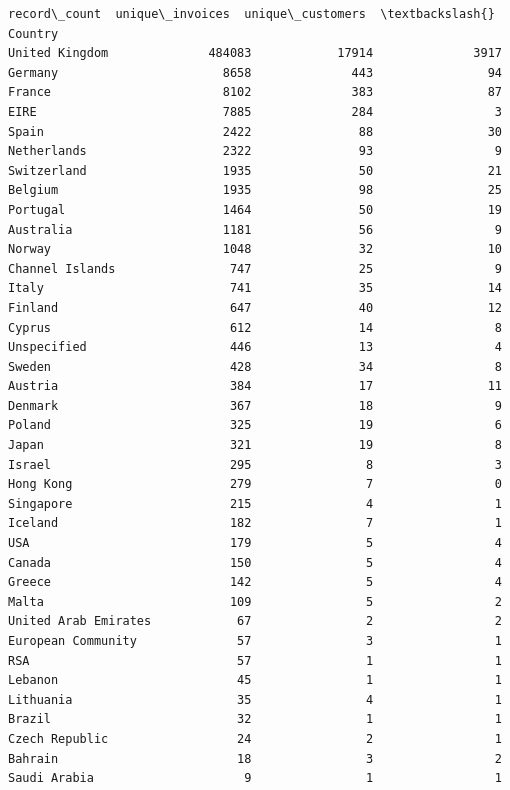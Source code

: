 \documentclass[11pt]{article}
\begin{document}
    
    \begin{Verbatim}[commandchars=\\\{\}]
                      record\_count  unique\_invoices  unique\_customers  \textbackslash{}
Country                                                                 
United Kingdom              484083            17914              3917   
Germany                       8658              443                94   
France                        8102              383                87   
EIRE                          7885              284                 3   
Spain                         2422               88                30   
Netherlands                   2322               93                 9   
Switzerland                   1935               50                21   
Belgium                       1935               98                25   
Portugal                      1464               50                19   
Australia                     1181               56                 9   
Norway                        1048               32                10   
Channel Islands                747               25                 9   
Italy                          741               35                14   
Finland                        647               40                12   
Cyprus                         612               14                 8   
Unspecified                    446               13                 4   
Sweden                         428               34                 8   
Austria                        384               17                11   
Denmark                        367               18                 9   
Poland                         325               19                 6   
Japan                          321               19                 8   
Israel                         295                8                 3   
Hong Kong                      279                7                 0   
Singapore                      215                4                 1   
Iceland                        182                7                 1   
USA                            179                5                 4   
Canada                         150                5                 4   
Greece                         142                5                 4   
Malta                          109                5                 2   
United Arab Emirates            67                2                 2   
European Community              57                3                 1   
RSA                             57                1                 1   
Lebanon                         45                1                 1   
Lithuania                       35                4                 1   
Brazil                          32                1                 1   
Czech Republic                  24                2                 1   
Bahrain                         18                3                 2   
Saudi Arabia                     9                1                 1   


\end{Verbatim}
\end{document}
